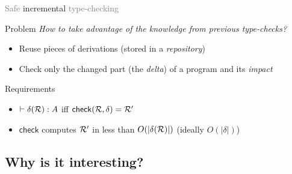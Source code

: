 \documentclass{beamer}
\theoremstyle{example}
\begin{document}
\begin{frame}{\textcolor{gray}{Safe} incremental
    \textcolor{gray}{type-checking}}

    \begin{block}{Problem}
      \emph{How to take advantage of the knowledge from previous type-checks?}
      \begin{itemize}
      \item Reuse pieces of derivations (stored in a \emph{repository})
      \item Check only the changed part (the \emph{delta}) of a
        program and its \emph{impact}
      \end{itemize}

        \centering
    \end{block}
    \pause

    \begin{block}{Requirements}
      \begin{itemize}
      \item $\vdash \delta(\mathcal{R}) : A$ iff ${\rm\mathsf{check}}({\mathcal{R},
          \delta}) = \mathcal{R'}$
      \item $\mathsf{check}$ computes $\mathcal{R'}$ in less than $O(|\delta(\mathcal{R})|)$ \small\qquad (ideally
        $O(|\delta|)$)
      \end{itemize}
    \end{block}

\end{frame}

\subsection{Why is it interesting?}

\newcommand{\cfbox}[2]{%
    \colorlet{currentcolor}{.}%
    {\color{#1}%
    \fbox{\color{currentcolor}#2}}%
}
\end{document}
